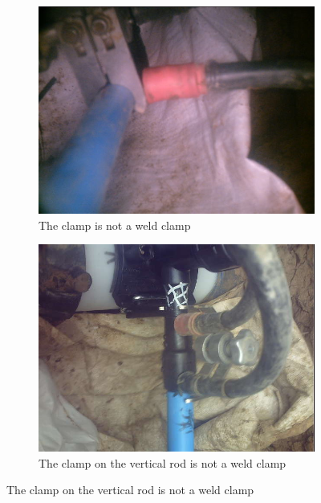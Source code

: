 \documentclass[a4paper,11pt]{article}
\begin{document}
\begin{figure}
    \centering
    \begin{minipage}[b]{\textwidth}
      \begin{subfigure}{.5\textwidth} 
        \centering
        \includegraphics[scale=0.3]{images/truly_confusing_1.jpg}
        \caption{The clamp is not a weld clamp}\label{fig:2a}
      \end{subfigure}%
      \begin{subfigure}{.5\textwidth} 
        \centering
        \includegraphics[scale=0.3]{images/truly_confusing_2.jpg}
        \caption{The clamp on the vertical rod is not a weld clamp}\label{fig:2b}
      \end{subfigure} \par \vspace*{20pt} %
    \end{minipage}%
    \label{f5}
\end{figure}
\end{document}
